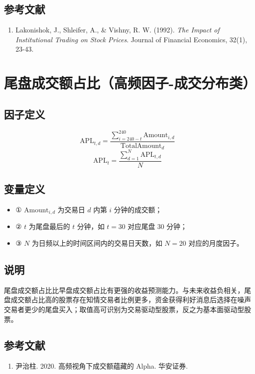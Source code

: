 \documentclass{article}
\begin{document}
\subsection{参考文献}
\begin{enumerate}
    \item Lakonishok, J., Shleifer, A., \& Vishny, R. W. (1992). \textit{The Impact of Institutional Trading on Stock Prices}. Journal of Financial Economics, 32(1), 23-43.
\end{enumerate}

\section{尾盘成交额占比（高频因子-成交分布类）}

\subsection{因子定义}
\begin{equation}
    \mathrm{APL}_{t,d} = \frac{\sum_{i=240-t}^{240} \mathrm{Amount}_{i,d}}{\mathrm{TotalAmount}_d}
\end{equation}
\begin{equation}
    \mathrm{APL}_t = \frac{\sum_{d=1}^{N} \mathrm{APL}_{t,d}}{N}
\end{equation}

\subsection{变量定义}
\begin{itemize}
    \item ① \( \mathrm{Amount}_{i,d} \) 为交易日 \( d \) 内第 \( i \) 分钟的成交额；
    \item ② \( t \) 为尾盘最后的 \( t \) 分钟，如 \( t=30 \) 对应尾盘 30 分钟；
    \item ③ \( N \) 为日频以上的时间区间内的交易日天数，如 \( N=20 \) 对应的月度因子。
\end{itemize}

\subsection{说明}
尾盘成交额占比比早盘成交额占比有更强的收益预测能力。与未来收益负相关，尾盘成交额占比高的股票存在知情交易者比例更多，资金获得利好消息后选择在噪声交易者更少的尾盘买入；取值高可识别为交易驱动型股票，反之为基本面驱动型股票。

\subsection{参考文献}
\begin{enumerate}
    \item 尹治柱. 2020. 高频视角下成交额蕴藏的 Alpha. 华安证券.
\end{enumerate}
\end{document}
